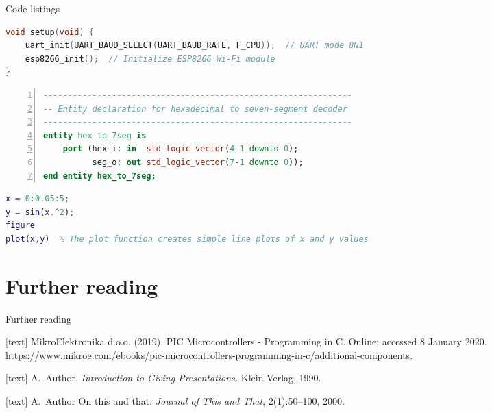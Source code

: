 \documentclass[aspectratio=1610]{beamer}
\begin{document}
\begin{frame}[fragile]{Code listings}

\begin{lstlisting}[language=C,title={This is title}]
void setup(void) {
    uart_init(UART_BAUD_SELECT(UART_BAUD_RATE, F_CPU));  // UART mode 8N1
    esp8266_init();  // Initialize ESP8266 Wi-Fi module
}
\end{lstlisting}

\begin{lstlisting}[language=vhdl,title={This is title},numbers=left]
---------------------------------------------------------------
-- Entity declaration for hexadecimal to seven-segment decoder
---------------------------------------------------------------
entity hex_to_7seg is
    port (hex_i: in  std_logic_vector(4-1 downto 0);
          seg_o: out std_logic_vector(7-1 downto 0));
end entity hex_to_7seg;
\end{lstlisting}

\begin{lstlisting}[language=Matlab,caption={This is caption}]
x = 0:0.05:5;
y = sin(x.^2);
figure
plot(x,y)  % The plot function creates simple line plots of x and y values
\end{lstlisting}
    \note{~}
\end{frame}



\section{Further reading}

\begin{frame}[allowframebreaks]{Further reading}
    \begin{thebibliography}{10}
        [text]
         MikroElektronika d.o.o. (2019).
            \newblock PIC Microcontrollers - Programming in C. Online; accessed 8 January 2020.
            \newblock \url{https://www.mikroe.com/ebooks/pic-microcontrollers-programming-in-c/additional-components}.

        [text]
         A.~Author.
            \newblock \textit{Introduction to Giving Presentations.}
            \newblock Klein-Verlag, 1990.

        [text]
         A.~Author
            \newblock On this and that.
            \newblock \textit{Journal of This and That}, 2(1):50--100, 2000.
    \end{thebibliography}
\end{frame}

\end{document}

